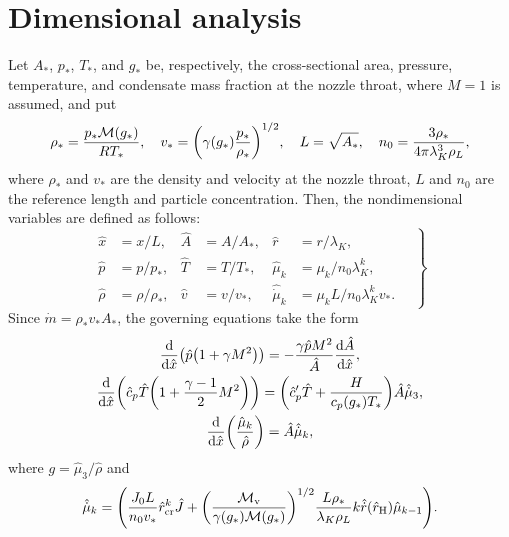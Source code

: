 \documentclass{article}
\newcommand{\vap}{\text{v}}
\newcommand{\crit}[2][]{#2_\text{cr#1}}
\newcommand{\Hill}{\text{H}}
\begin{document}
\section{Dimensional analysis}

Let $A_*$, $p_*$, $T_*$, and $g_*$ be, respectively, the cross-sectional area, pressure, temperature,
and condensate mass fraction at the nozzle throat, where $M=1$ is assumed, and put
\begin{equation}\label{eq:reference}
    \rho_* = \frac{p_*\mathcal{M}(g_*)}{RT_*}, \quad
    v_* = \qty(\gamma(g_*)\frac{p_*}{\rho_*})^{1/2}, \quad
    L = \sqrt{A_*}, \quad
    n_0 = \frac{3\rho_*}{4\pi\lambda_K^3\rho_L},
\end{equation}
where $\rho_*$ and $v_*$ are the density and velocity at the nozzle throat,
$L$ and $n_0$ are the reference length and particle concentration.
Then, the nondimensional variables are defined as follows:
\begin{equation}\label{eq:nondimensional}
    \left.\begin{aligned}
        \hat{x} &= x/L,             &\hat{A} &= A/A_*,  &\hat{r} &= r/\lambda_K, \\
        \hat{p} &= p/p_*,           &\hat{T} &= T/T_*,  &\hat{\mu}_k &= \mu_k/n_0\lambda_K^k, \\
        \hat{\rho} &= \rho/\rho_*,  &\hat{v} &= v/v_*,  &\hat{\dot{\mu}}_k &= \mu_kL/n_0\lambda_K^kv_*.
    \end{aligned}\quad\right\}
\end{equation}
Since $\dot{m} = \rho_*v_*A_*$, the governing equations take the form
\begin{gather}
    \dv{\hat{x}}(\hat{p}\qty(1 + \gamma M^2))
        = -\frac{\gamma \hat{p} M^2}{\hat{A}}\dv{\hat{A}}{\hat{x}}, \label{eq:momentum3}\\
    \dv{\hat{x}}(\hat{c}_p\hat{T}\qty(1 + \frac{\gamma-1}{2}M^2))
        = \qty(\hat{c}_p'\hat{T} + \frac{H}{c_p(g_*)T_*})\hat{A}\hat{\dot{\mu}}_3, \label{eq:energy3}\\
    \dv{\hat{x}}(\frac{\hat{\mu}_k}{\hat{\rho}}) = \hat{A}\hat{\dot{\mu}}_k, \label{eq:moments3}
\end{gather}
where $g = \hat{\mu}_3/\hat{\rho}$ and
\begin{equation}\label{eq:dot_mu_k}
    \hat{\dot{\mu}}_k = \qty( \frac{J_0L}{n_0v_*} \crit{\hat{r}}^{k}\hat{J}
        + \qty(\frac{\mathcal{M}_\vap}{\gamma(g_*)\mathcal{M}(g_*)})^{1/2}\frac{L\rho_*}{\lambda_K\rho_L}
            k\hat{\dot{r}}(\hat{r}_\Hill)\hat{\mu}_{k-1}).
\end{equation}
\end{document}
